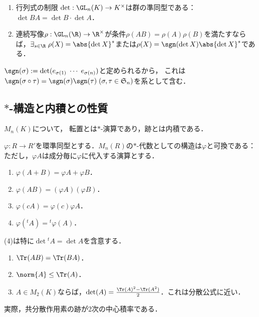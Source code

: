 \documentclass[uplatex, dvipdfmx]{jsreport}
\begin{document}
\begin{proposition}\mbox{}
    \begin{enumerate}
        \item 行列式の制限
        $\det:\GL_n(K)\to K^\times$は群の準同型である：$\det BA=\det B\cdot\det A$．
        \item 連続写像$\rho:\GL_n(\R)\to\R^\times$が条件$\rho(AB)=\rho(A)\rho(B)$を満たすならば，$\exists_{s\in\R}\;\rho(X)=\abs{\det X}^s$または$\rho(X)=\sgn(\det X)\abs{\det X}^s$である．
    \end{enumerate}
\end{proposition}
\begin{remarks}[置換の符号]
    $\sgn(\sigma):=\det(e_{\sigma(1)}\;\cdots\;e_{\sigma(n)})$と定められるから，
    これは$\sgn(\sigma\circ\tau)=\sgn(\sigma)\sgn(\tau)\;(\sigma,\tau\in\mathfrak{S}_n)$を系として含む．
\end{remarks}

\subsection{$*$-構造と内積との性質}

\begin{tcolorbox}[colframe=ForestGreen, colback=ForestGreen!10!white,breakable,colbacktitle=ForestGreen!40!white,coltitle=black,fonttitle=\bfseries\sffamily,
title=]
    $M_n(K)$について，
    転置とは$*$-演算であり，跡とは内積である．
\end{tcolorbox}

\begin{proposition}
    $\varphi:R\to R'$を環準同型とする．$M_n(R)$の$*$-代数としての構造は$\varphi$と可換である：
    ただし，$\varphi A$は成分毎に$\varphi$に代入する演算とする．
    \begin{enumerate}
        \item $\varphi(A+B)=\varphi A+\varphi B$．
        \item $\varphi(AB)=(\varphi A)(\varphi B)$．
        \item $\varphi(cA)=\varphi(c)\varphi A$．
        \item $\varphi({}^t\!A)={}^t\!\varphi(A)$．
    \end{enumerate}
    (4)は特に$\det{}^t\!A=\det A$を含意する．
\end{proposition}

\begin{proposition}\mbox{}
    \begin{enumerate}
        \item $\Tr(AB)=\Tr(BA)$．
        \item $\norm{A}\le\Tr(A)$．
        \item $A\in M_2(K)$ならば，$\det(A)=\frac{\Tr(A)^2-\Tr(A^2)}{2}$．これは分散公式に近い．
    \end{enumerate}
\end{proposition}
\begin{remarks}
    実際，共分散作用素の跡が2次の中心積率である．
\end{remarks}
\end{document}
